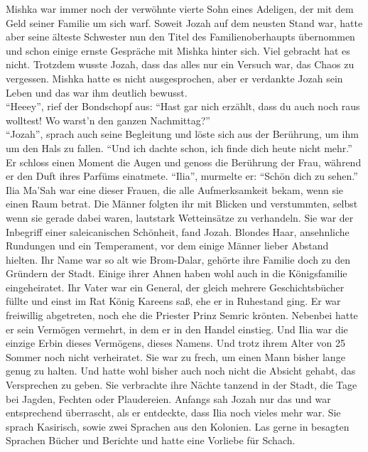 Mishka war immer noch der verwöhnte vierte Sohn eines Adeligen, der mit dem Geld seiner Familie um 
sich warf. Soweit Jozah auf dem neusten Stand war, hatte aber seine älteste Schwester nun den Titel 
des Familienoberhaupts übernommen und schon einige ernste Gespräche mit Mishka hinter sich. Viel 
gebracht hat es nicht. Trotzdem wusste Jozah, dass das alles nur ein Versuch war, das Chaos 
zu vergessen. Mishka hatte es nicht ausgesprochen, aber er verdankte Jozah sein Leben und das war 
ihm deutlich bewusst.\\
``Heeey'', rief der Bondschopf aus: ``Hast gar nich erzählt, dass du auch noch raus wolltest! Wo 
warst'n den ganzen Nachmittag?''\\
``Jozah'', sprach auch seine Begleitung und löste sich aus der Berührung, um ihm um den Hals zu 
fallen. ``Und ich dachte schon, ich finde dich heute nicht mehr.''\\
Er schloss einen Moment die Augen und genoss die Berührung der Frau, während er den Duft ihres 
Parfüms einatmete. ``Ilia'', murmelte er: ``Schön dich zu sehen.''\\
Ilia Ma'Sah war eine dieser Frauen, die alle Aufmerksamkeit bekam, wenn sie einen Raum betrat. Die 
Männer folgten ihr mit Blicken und verstummten, selbst wenn sie gerade dabei waren, lautstark 
Wetteinsätze zu verhandeln. Sie war der Inbegriff einer saleicanischen Schönheit, fand Jozah. 
Blondes Haar, ansehnliche Rundungen und ein Temperament, vor dem einige Männer lieber Abstand 
hielten. Ihr Name war so alt wie Brom-Dalar, gehörte ihre Familie doch zu den Gründern der Stadt. 
Einige ihrer Ahnen haben wohl auch in die Königsfamilie eingeheiratet. Ihr Vater war ein General, 
der gleich mehrere Geschichtsbücher füllte und einst im Rat König Kareens saß, ehe er in Ruhestand 
ging. Er war freiwillig abgetreten, noch ehe die Priester Prinz Semric krönten. Nebenbei hatte er 
sein Vermögen vermehrt, in dem er in den Handel einstieg. Und Ilia war die einzige Erbin dieses 
Vermögens, dieses Namens. Und trotz ihrem Alter von 25 Sommer noch nicht verheiratet. Sie war zu 
frech, um einen Mann bisher lange genug zu halten. Und hatte wohl bisher auch noch nicht die 
Absicht gehabt, das Versprechen zu geben. Sie verbrachte ihre Nächte tanzend in der Stadt, die Tage 
bei Jagden, Fechten oder Plaudereien. Anfangs sah Jozah nur das und war entsprechend überrascht, 
als er entdeckte, dass Ilia noch vieles mehr war. Sie sprach Kasirisch, sowie zwei Sprachen aus den 
Kolonien. Las gerne in besagten Sprachen Bücher und Berichte und hatte eine Vorliebe für Schach.\\
